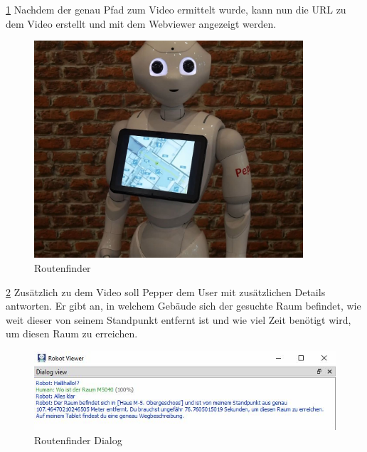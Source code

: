 \ref{fig:Routenfinder} Nachdem der genau Pfad zum Video ermittelt wurde, kann nun die URL zu dem Video erstellt und mit dem Webviewer angezeigt werden.

\begin{figure}[H]
    \centering
    \includegraphics[width=10cm]{Figures/AppChapter/rx4.JPG}
    \caption{Routenfinder}
    \label{fig:Routenfinder}
    \centering
\end{figure}

\ref{fig:RoutenfinderDia} Zusätzlich zu dem Video soll Pepper dem User mit zusätzlichen Details antworten. Er gibt an, in welchem Gebäude sich der gesuchte Raum befindet, 
wie weit dieser von seinem Standpunkt entfernt ist und wie viel Zeit benötigt wird, um diesen Raum zu erreichen.

\begin{figure}[H]
    \centering
    \includegraphics[width=\textwidth]{Figures/AppChapter/raumfinder_1.JPG}
    \caption{Routenfinder Dialog}
    \label{fig:RoutenfinderDia}
    \centering
\end{figure}



